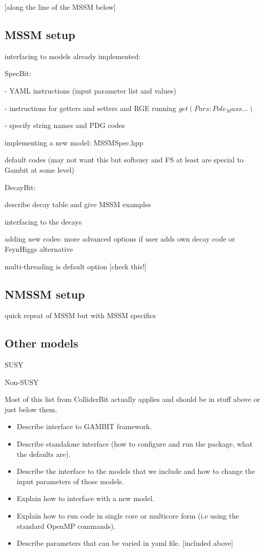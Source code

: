 \documentclass[11pt,a4paper]{article}
\begin{document}
[along the line of the MSSM below]

\subsection{MSSM setup} 

interfacing to models already implemented:

SpecBit:

- YAML instructions (input parameter list and values)

- instructions for getters and setters and RGE running
  $get(Pars:Pole_Mass...)$

- specify string names and PDG codes

implementing a new model: MSSMSpec.hpp

default codes 
         (may not want this but softsusy and FS at least 
                         are special to Gambit at some level) 

DecayBit: 

describe decay table and give MSSM examples

interfacing to the decays

adding new codes: more advanced options if user adds own decay code or FeynHiggs alternative
 
multi-threading is default option [check this!]

\subsection{NMSSM setup}

    quick repeat of MSSM but with MSSM specifics


\subsection{Other models}
 
    SUSY

    Non-SUSY


Most of this list from ColliderBit actually applies and should be in stuff above or just below them.
\begin{itemize}
\item Describe interface to GAMBIT framework.
\item Describe standalone interface (how to configure and run the package, what the defaults are).
\item Describe the interface to the models that we include and how to change the input parameters of those models.
\item Explain how to interface with a new model.
\item Explain how to run code in single core or multicore form (i.e using the standard OpenMP commands).
\item Describe parameters that can be varied in yaml file. [included above]
\end{itemize}
\end{document}
